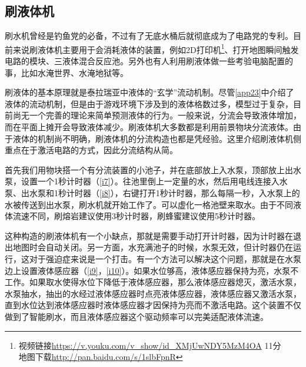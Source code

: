 \subsection{刷液体机}

刷水机曾经是钓鱼党的必备，不过有了无底水桶后就彻底成为了电路党的专利。目前来说刷液体机主要用于会消耗液体的装置，例如2D打印机\footnote{视频链接\url{https://v.youku.com/v_show/id_XMjUwNDY5MzM4OA} 11分\\地图下载\url{http://pan.baidu.com/s/1slbFpnR}}、打开地图瞬间触发电路的模块、三液体混合反应池。另外也有人利用刷液体做一些考验电脑配置的事，比如水淹世界、水淹地狱等。

刷液体的基本原理就是泰拉瑞亚中液体的“玄学”流动机制。尽管\autoref{app23}中介绍了液体的流动机制，但是由于游戏环境下涉及到的液体格数过多，模型过于复杂，目前尚无一个完善的理论来简单预测液体的行为。一般来说，分流会导致液体增加，而在平面上摊开会导致液体减少。刷液体机大多数都是利用前景物块分流液体。由于液体的机制尚不明确，刷液体机的分流构造也都是凭经验。这里介绍刷液体机侧重点在于激活电路的方式，因此分流结构从简。

首先我们用物块搭一个有分流装置的小池子，并在底部放上入水泵，顶部放上出水泵，设置一个1秒计时器（\autoref{i7}）。往池里倒上一定量的水，然后用电线连接入水泵、出水泵和1秒计时器（\autoref{i8}），右键打开1秒计时器，那么每隔一秒，入水泵上的水被传送到出水泵，刷水机就开始工作了。可以虚化一格池壁来取水。由于不同液体流速不同，刷熔岩建议使用3秒计时器，刷蜂蜜建议使用5秒计时器。

这种构造的刷液体机有一个小缺点，那就是需要手动打开计时器，因为计时器在退出地图时会自动关闭。另一方面，水充满池子的时候，水泵无效，但计时器仍在运行，这对于强迫症来说是一个打击。有一个方法可以解决这个问题，那就是在水泵边上设置液体感应器（\autoref{i9}，\autoref{i10}）。如果水位够高，液体感应器保持为亮，水泵不工作。如果取水使得水位下降低于液体感应器，那么液体感应器熄灭，激活水泵，水泵抽水，抽出的水经过液体感应器时点亮液体感应器，液体感应器又激活水泵，直到水位达到液体感应器时液体感应器才因保持为亮而不激活电路。这个装置不仅做到了智能刷水，而且液体感应器这个驱动频率可以完美适配液体流速。

